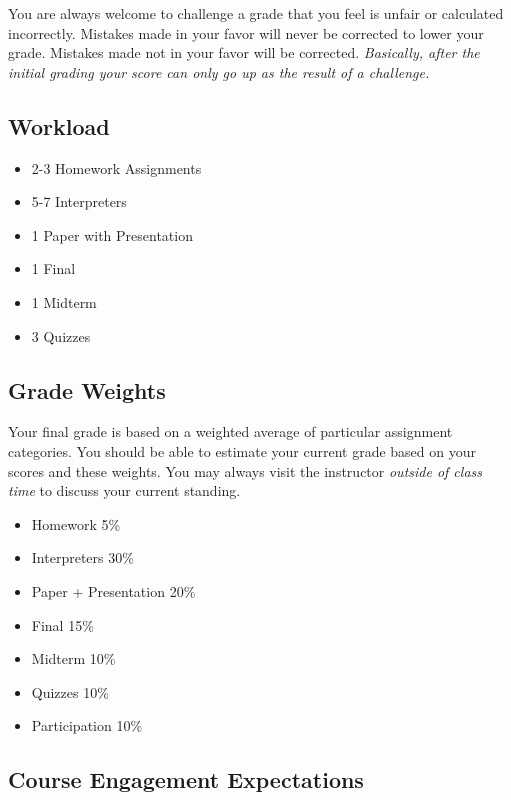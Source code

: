 \documentclass[10pt]{article}
\begin{document}
You are always welcome to challenge a grade that you feel is unfair or calculated incorrectly.  Mistakes made in your favor will never be corrected to lower your grade.  Mistakes made not in your favor will be corrected.  \textit{Basically, after the initial grading your score can only go up as the result of a challenge.}

\subsection{Workload}

\begin{itemize}
\item 2-3 Homework Assignments 
\item 5-7 Interpreters
\item 1 Paper with Presentation
\item 1 Final
\item 1 Midterm
\item 3 Quizzes
\end{itemize}

\subsection{Grade Weights}

Your final grade is based on a weighted average of particular assignment categories.  You should be able to estimate your current grade based on your scores and these weights.  You may always visit the instructor \textit{outside of class time} to discuss your current standing.  
\begin{itemize}
\item Homework 5\%
\item Interpreters 30\%
\item Paper + Presentation 20\%
\item Final 15\%
\item Midterm 10\%
\item Quizzes 10\%
\item Participation 10\%
\end{itemize} 

\subsection{Course Engagement Expectations}
\end{document}
